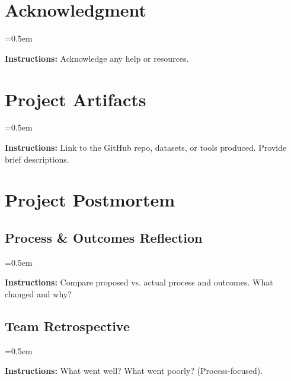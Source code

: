 \documentclass[conference]{IEEEtran}
\newcommand{\instruction}[1]{%
    \begin{list}{}{%
        \leftmargin=10pt
        \rightmargin=10pt
        \topsep=0.5em
    }
    \item[]
    \begingroup
        \color{gray}\itshape
        \small
        
        \textbf{Instructions:} #1
    \endgroup
    \end{list}
}
\begin{document}
\section*{Acknowledgment}
\instruction{Acknowledge any help or resources.}


 

\appendices

\section{Project Artifacts}
\instruction{Link to the GitHub repo, datasets, or tools produced. Provide brief descriptions.}

\section{Project Postmortem}

\subsection{Process \& Outcomes Reflection}
\instruction{Compare proposed vs. actual process and outcomes. What changed and why?}

\subsection{Team Retrospective}
\instruction{What went well? What went poorly? (Process-focused).}
\end{document}
